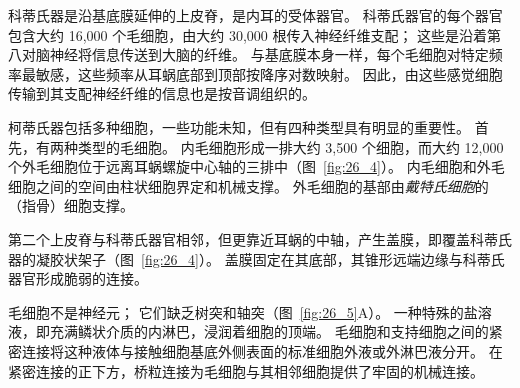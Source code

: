 科蒂氏器是沿基底膜延伸的上皮脊，是内耳的受体器官。
科蒂氏器官的每个器官包含大约 16,000 个毛细胞，由大约 30,000 根传入神经纤维支配；
这些是沿着第八对脑神经将信息传送到大脑的纤维。
与基底膜本身一样，每个毛细胞对特定频率最敏感，这些频率从耳蜗底部到顶部按降序对数映射。
因此，由这些感觉细胞传输到其支配神经纤维的信息也是按音调组织的。


柯蒂氏器包括多种细胞，一些功能未知，但有四种类型具有明显的重要性。
首先，有两种类型的毛细胞。
内毛细胞形成一排大约 3,500 个细胞，而大约 12,000 个外毛细胞位于远离耳蜗螺旋中心轴的三排中（图~\ref{fig:26_4}）。
内毛细胞和外毛细胞之间的空间由柱状细胞界定和机械支撑。
外毛细胞的基部由\textit{戴特氏细胞}的（指骨）细胞支撑。


第二个上皮脊与科蒂氏器官相邻，但更靠近耳蜗的中轴，产生盖膜，即覆盖科蒂氏器的凝胶状架子（图~\ref{fig:26_4}）。
盖膜固定在其底部，其锥形远端边缘与科蒂氏器官形成脆弱的连接。


毛细胞不是神经元； 它们缺乏树突和轴突（图~\ref{fig:26_5}A）。
一种特殊的盐溶液，即充满鳞状介质的内淋巴，浸润着细胞的顶端。
毛细胞和支持细胞之间的紧密连接将这种液体与接触细胞基底外侧表面的标准细胞外液或外淋巴液分开。
在紧密连接的正下方，桥粒连接为毛细胞与其相邻细胞提供了牢固的机械连接。


